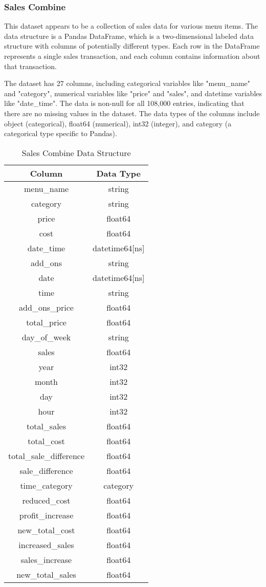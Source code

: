 \subsubsection{Sales Combine}

This dataset appears to be a collection of sales data for various menu items. The data structure is a Pandas DataFrame, which is a two-dimensional labeled data structure with columns of potentially different types. Each row in the DataFrame represents a single sales transaction, and each column contains information about that transaction.

The dataset has 27 columns, including categorical variables like "menu{\_}name" and "category", numerical variables like "price" and "sales", and datetime variables like "date{\_}time". The data is non-null for all 108,000 entries, indicating that there are no missing values in the dataset. The data types of the columns include object (categorical), float64 (numerical), int32 (integer), and category (a categorical type specific to Pandas).

\begin{table}[H]
	\centering
	\begin{tabular}{cc}
		\toprule
		Column & Data Type \\
		\midrule
		menu\_name & string \\
		category & string \\
		price & float64 \\
		cost & float64 \\
		date\_time & datetime64[ns] \\
		add\_ons & string \\
		date & datetime64[ns] \\
		time & string \\
		add\_ons\_price & float64 \\
		total\_price & float64 \\
		day\_of\_week & string \\
		sales & float64 \\
		year & int32 \\
		month & int32 \\
		day & int32 \\
		hour & int32 \\
		total\_sales & float64 \\
		total\_cost & float64 \\
		total\_sale\_difference & float64 \\
		sale\_difference & float64 \\
		time\_category & category \\
		reduced\_cost & float64 \\
		profit\_increase & float64 \\
		new\_total\_cost & float64 \\
		increased\_sales & float64 \\
		sales\_increase & float64 \\
		new\_total\_sales & float64 \\
		\bottomrule
	\end{tabular}
	\caption{Sales Combine Data Structure}
	\label{tab:sales_combine_data_structure}
\end{table}

